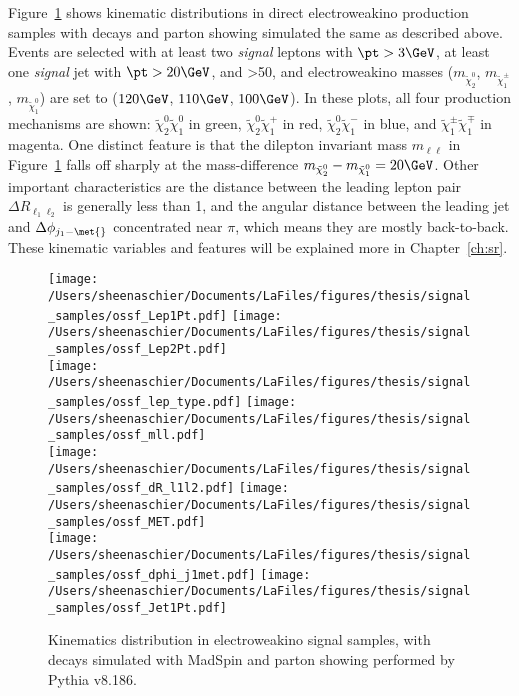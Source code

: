 Figure~\ref{fig:SigSample1} shows kinematic distributions in direct electroweakino production samples with decays and parton showing simulated the same as described above.  Events are selected with at least two \textit{signal} leptons with $\pt>3\GeV$, at least one \textit{signal} jet with $\pt>20\GeV$, and \met{}>50, and electroweakino masses ($m_{\tilde\chi_2^0}$, $m_{\tilde\chi_1^\pm}$, $m_{\tilde\chi_1^0}$) are set to ($120\GeV$, $110\GeV$, $100\GeV$).  In these plots, all four production mechanisms are shown: $\tilde\chi_2^0\tilde\chi_1^0$ in green, $\tilde\chi_2^0\tilde\chi_1^+$ in red, $\tilde\chi_2^0\tilde\chi_1^-$ in blue, and $\tilde\chi_1^\pm\tilde\chi_1^\mp$ in magenta.  One distinct feature is that the dilepton invariant mass $m_{\ell\ell}$ in Figure~\ref{fig:SigSample1} falls off sharply at the mass-difference $m_{\tilde\chi_2^0}-m_{\tilde\chi_1^0} = 20\GeV$.  Other important characteristics are the distance between the leading lepton pair $\Delta R_{\ell_1\ell_2}$ is generally less than 1, and the angular distance between the leading jet and \met $\Delta\phi_{j_1-\met{}}$ concentrated near $\pi$, which means they are mostly back-to-back.  These kinematic variables and features will be explained more in Chapter~\ref{ch:sr}. 

  \begin{figure}[tbp]
 \texttt{[image: /Users/sheenaschier/Documents/LaFiles/figures/thesis/signal\_samples/ossf\_Lep1Pt.pdf]}
 \texttt{[image: /Users/sheenaschier/Documents/LaFiles/figures/thesis/signal\_samples/ossf\_Lep2Pt.pdf]}\\
 \texttt{[image: /Users/sheenaschier/Documents/LaFiles/figures/thesis/signal\_samples/ossf\_lep\_type.pdf]}
  \texttt{[image: /Users/sheenaschier/Documents/LaFiles/figures/thesis/signal\_samples/ossf\_mll.pdf]}\\
  \texttt{[image: /Users/sheenaschier/Documents/LaFiles/figures/thesis/signal\_samples/ossf\_dR\_l1l2.pdf]}
    \texttt{[image: /Users/sheenaschier/Documents/LaFiles/figures/thesis/signal\_samples/ossf\_MET.pdf]}\\
      \texttt{[image: /Users/sheenaschier/Documents/LaFiles/figures/thesis/signal\_samples/ossf\_dphi\_j1met.pdf]}
       \texttt{[image: /Users/sheenaschier/Documents/LaFiles/figures/thesis/signal\_samples/ossf\_Jet1Pt.pdf]}
 \caption{Kinematics distribution in electroweakino signal samples, with decays simulated with MadSpin and parton showing performed by Pythia v8.186.}
   \label{fig:SigSample1}
 \end{figure}
 
